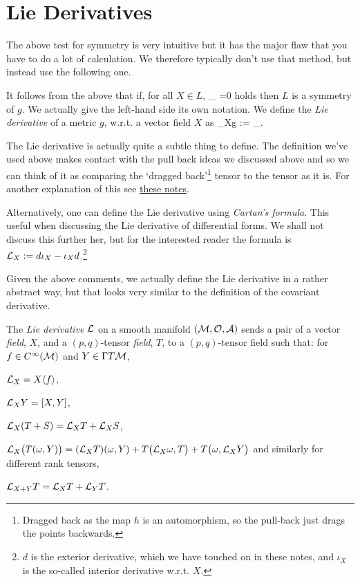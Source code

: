 \section{Lie Derivatives}

The above test for symmetry is very intuitive but it has the major flaw that you have to do a lot of calculation. We therefore typically don't use that method, but instead use the following one. 

It follows from the above that if, for all $X\in L$, 
\bse 
    \lim_{\lambda{}} =0
\ese 
holds then $L$ is a symmetry of $g$. We actually give the left-hand side its own notation. We define the \textit{Lie derivative} of a metric $g$, w.r.t. a vector field $X$ as 
\bse 
    \cL_Xg := \lim_{\lambda{}}.
\ese

The Lie derivative is actually quite a subtle thing to define. The definition we've used above makes contact with the pull back ideas we discussed above and so we can think of it as comparing the `dragged back'\footnote{Dragged back as the map $h$ is an automorphism, so the pull-back just drags the points backwards.} tensor to the tensor as it is. For another explanation of this see \href{http://web.math.ucsb.edu/~ebrahim/liederivs_tame.pdf}{these notes}.

\br 
    Alternatively, one can define the Lie derivative using \textit{Cartan's formula}. This useful when discussing the Lie derivative of differential forms. We shall not discuss this further her, but for the interested reader the formula is $\mathcal{L}_X := d\iota_X - \iota_Xd$.\footnote{$d$ is the exterior derivative, which we have touched on in these notes, and $\iota_X$ is the so-called interior derivative w.r.t. $X$.}
\er

Given the above comments, we actually define the Lie derivative in a rather abstract way, but that looks very similar to the definition of the covariant derivative. 

    The \textit{Lie derivative} $\mathcal{L}$ on a smooth manifold $(\mathcal{M},\mathcal{O},\mathcal{A})$ sends a pair of a vector \textit{field}, $X$, and a $(p,q)$-tensor \textit{field}, $T$, to a $(p,q)$-tensor field such that: for $f\in C^{\infty}(\mathcal{M})$ and $Y\in\Gamma T\mathcal{M}$,
    \benr 
        \item $\mathcal{L}_X = X\langle f\rangle$, 
        \item $\mathcal{L}_XY = [X,Y]$,
        \item $\mathcal{L}_X(T+S) = \mathcal{L}_XT+\mathcal{L}_XS$,
        \item $\mathcal{L}_X\big(T(\omega,Y)\big) = (\mathcal{L}_XT)(\omega,Y) + T\big(\mathcal{L}_X\omega,T\big)+T\big(\omega,\mathcal{L}_XY\big)$ and similarly for different rank tensors,
        \item $\mathcal{L}_{X+Y}T = \mathcal{L}_XT + \mathcal{L}_YT$.
    \een 
\ed 

